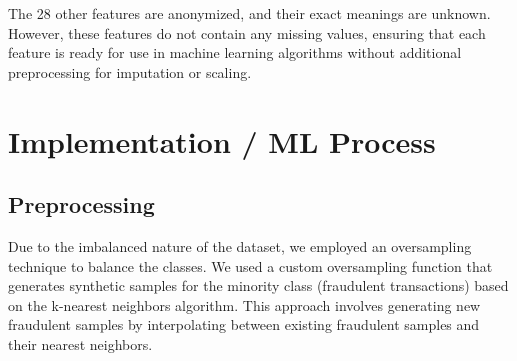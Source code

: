 \documentclass[a4, 10 pt, conference]{ieeeconf}  %
\begin{document}
The 28 other features are anonymized, and their exact meanings are unknown. However, these features do not contain any missing values, ensuring that each feature is ready for use in
machine learning algorithms without additional preprocessing for imputation or scaling.

\section{Implementation / ML Process}
\label{sec:methods}



\subsection{Preprocessing}
\label{sec:preprocess}
Due to the imbalanced nature of the dataset, we employed an oversampling technique to balance the classes. We used a custom
oversampling function that generates synthetic samples for the minority class (fraudulent transactions) based on the k-nearest
neighbors algorithm. This approach involves generating new fraudulent samples by interpolating between existing fraudulent
samples and their nearest neighbors.
\end{document}
